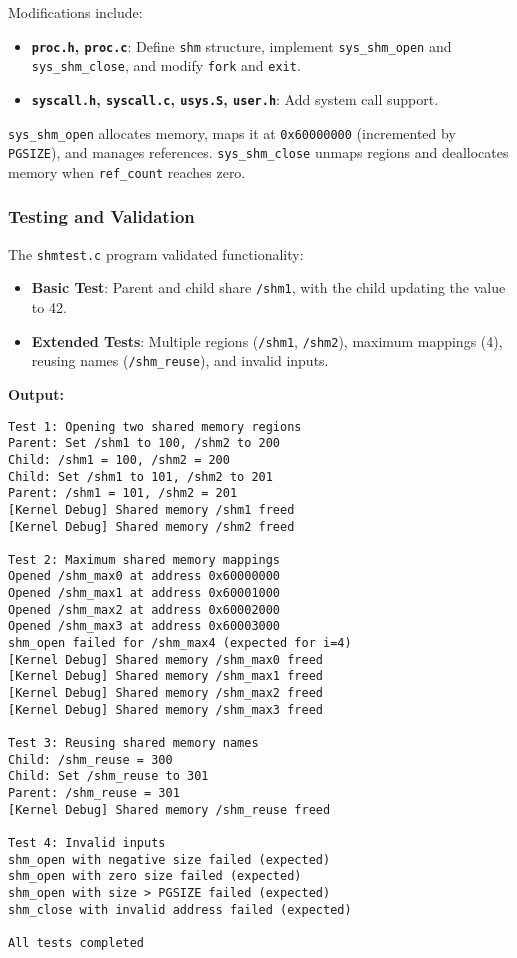 \documentclass[12pt]{article}
\begin{document}
Modifications include:
\begin{itemize}
  \item \textbf{\texttt{proc.h}, \texttt{proc.c}}: Define \texttt{shm} structure, implement \texttt{sys\_shm\_open} and \texttt{sys\_shm\_close}, and modify \texttt{fork} and \texttt{exit}.
  \item \textbf{\texttt{syscall.h}, \texttt{syscall.c}, \texttt{usys.S}, \texttt{user.h}}: Add system call support.
\end{itemize}

\texttt{sys\_shm\_open} allocates memory, maps it at \texttt{0x60000000} (incremented by \texttt{PGSIZE}), and manages references. \texttt{sys\_shm\_close} unmaps regions and deallocates memory when \texttt{ref\_count} reaches zero.

\subsubsection{Testing and Validation}
\label{subsubsec:shared-memory-testing}

The \texttt{shmtest.c} program validated functionality:
\begin{itemize}
  \item \textbf{Basic Test}: Parent and child share \texttt{/shm1}, with the child updating the value to 42.
  \item \textbf{Extended Tests}: Multiple regions (\texttt{/shm1}, \texttt{/shm2}), maximum mappings (4), reusing names (\texttt{/shm\_reuse}), and invalid inputs.
\end{itemize}

\textbf{Output:}
\begin{lstlisting}
Test 1: Opening two shared memory regions
Parent: Set /shm1 to 100, /shm2 to 200
Child: /shm1 = 100, /shm2 = 200
Child: Set /shm1 to 101, /shm2 to 201
Parent: /shm1 = 101, /shm2 = 201
[Kernel Debug] Shared memory /shm1 freed
[Kernel Debug] Shared memory /shm2 freed

Test 2: Maximum shared memory mappings
Opened /shm_max0 at address 0x60000000
Opened /shm_max1 at address 0x60001000
Opened /shm_max2 at address 0x60002000
Opened /shm_max3 at address 0x60003000
shm_open failed for /shm_max4 (expected for i=4)
[Kernel Debug] Shared memory /shm_max0 freed
[Kernel Debug] Shared memory /shm_max1 freed
[Kernel Debug] Shared memory /shm_max2 freed
[Kernel Debug] Shared memory /shm_max3 freed

Test 3: Reusing shared memory names
Child: /shm_reuse = 300
Child: Set /shm_reuse to 301
Parent: /shm_reuse = 301
[Kernel Debug] Shared memory /shm_reuse freed

Test 4: Invalid inputs
shm_open with negative size failed (expected)
shm_open with zero size failed (expected)
shm_open with size > PGSIZE failed (expected)
shm_close with invalid address failed (expected)

All tests completed
\end{lstlisting}
\end{document}
